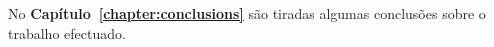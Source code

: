 No \textbf{Capítulo~\ref{chapter:conclusions}} são tiradas algumas conclusões sobre o trabalho efectuado.











